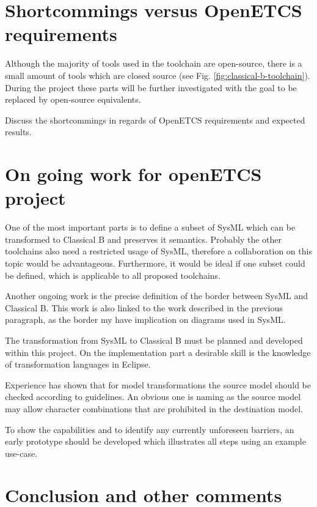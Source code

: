 \section{Shortcommings versus OpenETCS requirements}

Although the majority of tools used in the toolchain are open-source,
there is a small amount of tools which are closed source (see
Fig. \ref{fig:classical-b-toolchain}). During the project these parts
will be further investigated with the goal to be replaced by
open-source equivalents.



\begin{todo_comment}
Discuss the shortcommings in regards of OpenETCS requirements and expected results.
\end{todo_comment}

\section{On going work for openETCS project}

One of the most important parts is to define a subset of SysML which
can be transformed to Classical B and preserves it semantics. Probably
the other toolchains also need a restricted usage of SysML, therefore
a collaboration on this topic would be advantageous. Furthermore, it
would be ideal if one subset could be defined, which is applicable to
all proposed toolchains.

Another ongoing work is the precise definition of the border between
SysML and Classical B. This work is also linked to the work described
in the previous paragraph, as the border my have implication on
diagrams used in SysML.

The transformation from SysML to Classical B must be planned and
developed within this project. On the implementation part a desirable
skill is the knowledge of transformation languages in Eclipse.

Experience has shown that for model transformations the source model
should be checked according to guidelines. An obvious one is naming as
the source model may allow character combinations that are prohibited
in the destination model.

To show the capabilities and to identify any currently unforeseen
barriers, an early prototype should be developed which illustrates all
steps using an example use-case.

\section{Conclusion and other comments}
